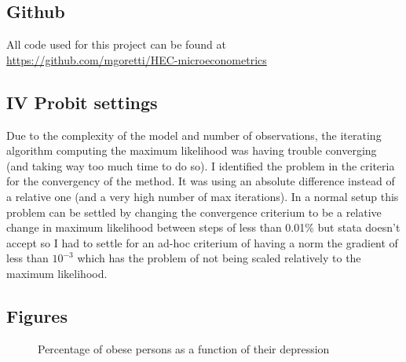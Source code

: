 \subsection{Github}
All code used for this project can be found at \\ \url{https://github.com/mgoretti/HEC-microeconometrics}

\subsection{IV Probit settings}
Due to the complexity of the model and number of observations, the iterating algorithm computing the maximum likelihood was having trouble converging (and taking way too much time to do so). I identified the problem in the criteria for the convergency of the method. It was using an absolute difference instead of a relative one (and a very high number of max iterations). In a normal setup this problem can be settled by changing the convergence criterium to be a relative change in maximum likelihood between steps of less than 0.01\% but stata doesn't accept so I had to settle for an ad-hoc criterium of having a norm the gradient of less than $10^{-3}$ which has the problem of not being scaled relatively to the maximum likelihood.

\subsection{Figures}
\begin{figure}[H]
\caption{Percentage of obese persons as a function of their depression }
\label{fig:obesity}
\end{figure}


